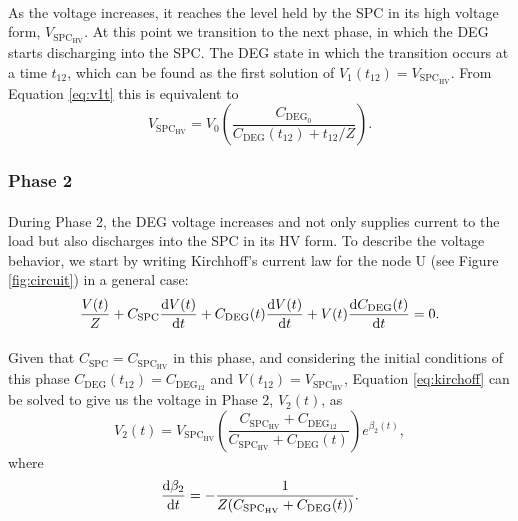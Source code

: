 \paragraph{} As the voltage increases, it reaches the level held by the SPC in its high voltage form, $V_{\text{SPC}_\text{HV}}$. At this point we transition to the next phase, in which the DEG starts discharging into the SPC. The DEG state in which the transition occurs at a time $t_{12}$, which can be found as the first solution of  $V_1(t_{12}) = V_{\text{SPC}_\text{HV}}$. From Equation \ref{eq:v1t} this is equivalent to
\begin{equation}
V_{\text{SPC}_\text{HV}} = V_0\left(\frac{C_{\text{DEG}_0}}{C_\text{DEG}(t_{12})+t_{12}/Z}\right).
\end{equation}


\subsubsection{Phase 2}

\paragraph{} During Phase 2, the DEG voltage increases and not only supplies current to the load but also discharges into the SPC in its HV form. To describe the voltage behavior, we start by writing Kirchhoff's current law for the node U (see Figure \ref{fig:circuit}) in a general case:
\begin{equation}\label{eq:kirchoff}
\frac{V(t)}{Z} + C_\text{SPC}\frac{\mathrm{d}V(t)}{\mathrm{d}t}+C_\text{DEG}(t)\frac{\mathrm{d}V(t)}{\mathrm{d}t}+V(t)\frac{\mathrm{d}C_\text{DEG}(t)}{\mathrm{d}t} = 0.
\end{equation}

\paragraph{} Given that $C_\text{SPC} =C_{\text{SPC}_\text{HV}}$ in this phase, and considering the initial conditions of this phase $C_\text{DEG}(t_{12}) = C_{\text{DEG}_{12}}$ and $V(t_{12}) = V_{\text{SPC}_\text{HV}}$, Equation \ref{eq:kirchoff} can be solved to give us the voltage in Phase 2, $V_2(t)$, as
\begin{equation}\label{eq:v2t}
V_2(t) = V_{\text{SPC}_\text{HV}}\left(\frac{C_{\text{SPC}_\text{HV}}+C_{\text{DEG}_{12}}}{C_{\text{SPC}_\text{HV}}+C_\text{DEG}(t)}\right)e^{\beta_2(t)},
\end{equation}
where
\begin{equation}
\frac{\mathrm{d}\beta_2}{\mathrm{d}t} = -\frac{1}{Z(C_{\text{SPC}_\text{HV}}+C_\text{DEG}(t))}.
\end{equation}

